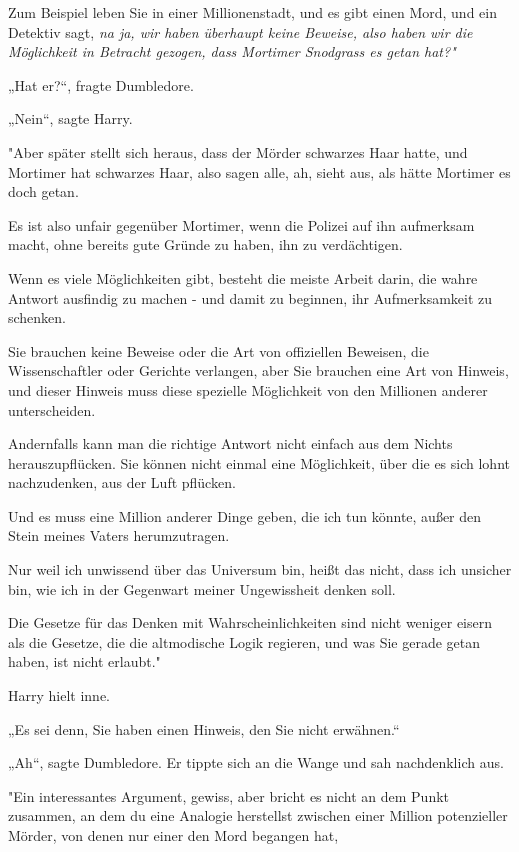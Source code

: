 {Zum Beispiel leben Sie in einer Millionenstadt, und es gibt einen Mord, und ein Detektiv sagt, \emph{na ja, wir haben überhaupt keine Beweise, also haben wir die Möglichkeit in Betracht gezogen, dass Mortimer Snodgrass es getan hat?"}

„Hat er?“, fragte Dumbledore.

„Nein“, sagte Harry.

"Aber später stellt sich heraus, dass der Mörder schwarzes Haar hatte, und Mortimer hat schwarzes Haar, also sagen alle, ah, sieht aus, als hätte Mortimer es doch getan.

Es ist also unfair gegenüber Mortimer, wenn die Polizei auf ihn aufmerksam macht, ohne bereits gute Gründe zu haben, ihn zu verdächtigen.

Wenn es viele Möglichkeiten gibt, besteht die meiste Arbeit darin, die wahre Antwort ausfindig zu machen - und damit zu beginnen, ihr Aufmerksamkeit zu schenken.

Sie brauchen keine Beweise oder die Art von offiziellen Beweisen, die Wissenschaftler oder Gerichte verlangen, aber Sie brauchen eine Art von Hinweis, und dieser Hinweis muss diese spezielle Möglichkeit von den Millionen anderer unterscheiden.

Andernfalls kann man die richtige Antwort nicht einfach aus dem Nichts herauszupflücken. Sie können nicht einmal eine Möglichkeit, über die es sich lohnt nachzudenken, aus der Luft pflücken.

Und es muss eine Million anderer Dinge geben, die ich tun könnte, außer den Stein meines Vaters herumzutragen.

Nur weil ich unwissend über das Universum bin, heißt das nicht, dass ich unsicher bin, wie ich in der Gegenwart meiner Ungewissheit denken soll.

Die Gesetze für das Denken mit Wahrscheinlichkeiten sind nicht weniger eisern als die Gesetze, die die altmodische Logik regieren, und was Sie gerade getan haben, ist nicht erlaubt."

Harry hielt inne.

„Es sei denn, Sie haben einen Hinweis, den Sie nicht erwähnen.“

„Ah“, sagte Dumbledore. Er tippte sich an die Wange und sah nachdenklich aus.

"Ein interessantes Argument, gewiss, aber bricht es nicht an dem Punkt zusammen, an dem du eine Analogie herstellst zwischen einer Million potenzieller Mörder, von denen nur einer den Mord begangen hat,

}
